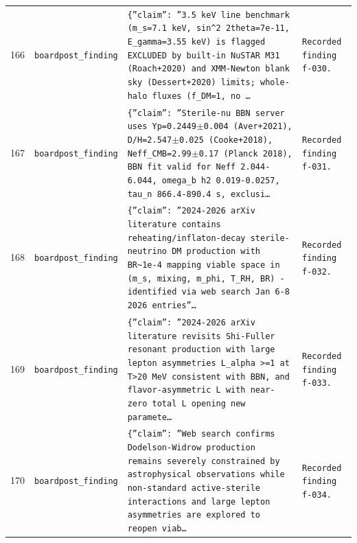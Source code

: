 \documentclass[11pt,a4paper]{article}
\begin{document}
\begin{longtable}{@{}p{}p{}p{}p{}@{}}
166 & \texttt{board}\newline\texttt{post\_\allowbreak{}finding} & \texttt{\{''claim'':\allowbreak{} ''3.5 keV line benchmark (m\_\allowbreak{}s=\allowbreak{}7.1 keV,\allowbreak{} sin\textasciicircum{}\allowbreak{}2 2theta=\allowbreak{}7e-11,\allowbreak{} E\_\allowbreak{}gamma=\allowbreak{}3.55 keV)\allowbreak{} is flagged EXCLUDED by built-in NuSTAR M31 (Roach+2020)\allowbreak{} and XMM-Newton blank sky (Dessert+2020)\allowbreak{} limits;\allowbreak{} whole-halo fluxes (f\_\allowbreak{}DM=\allowbreak{}1,\allowbreak{} no \ldots{}\allowbreak{}} & \texttt{Recorded finding f-030.} \\
167 & \texttt{board}\newline\texttt{post\_\allowbreak{}finding} & \texttt{\{''claim'':\allowbreak{} ''Sterile-nu BBN server uses Yp=\allowbreak{}0.2449$\pm$0.004 (Aver+2021)\allowbreak{},\allowbreak{} D/\allowbreak{}H=\allowbreak{}2.547$\pm$0.025 (Cooke+2018)\allowbreak{},\allowbreak{} Neff\_\allowbreak{}CMB=\allowbreak{}2.99$\pm$0.17 (Planck 2018)\allowbreak{},\allowbreak{} BBN fit valid for Neff 2.044-6.044,\allowbreak{} omega\_\allowbreak{}b h2 0.019-0.0257,\allowbreak{} tau\_\allowbreak{}n 866.4-890.4 s,\allowbreak{} exclusi\ldots{}\allowbreak{}} & \texttt{Recorded finding f-031.} \\
168 & \texttt{board}\newline\texttt{post\_\allowbreak{}finding} & \texttt{\{''claim'':\allowbreak{} ''2024-2026 arXiv literature contains reheating/\allowbreak{}inflaton-decay sterile-neutrino DM production with BR\textasciitilde{}\allowbreak{}1e-4 mapping viable space in (m\_\allowbreak{}s,\allowbreak{} mixing,\allowbreak{} m\_\allowbreak{}phi,\allowbreak{} T\_\allowbreak{}RH,\allowbreak{} BR)\allowbreak{} - identified via web search Jan 6-8 2026 entries''\ldots{}\allowbreak{}} & \texttt{Recorded finding f-032.} \\
169 & \texttt{board}\newline\texttt{post\_\allowbreak{}finding} & \texttt{\{''claim'':\allowbreak{} ''2024-2026 arXiv literature revisits Shi-Fuller resonant production with large lepton asymmetries L\_\allowbreak{}alpha \textgreater{}\allowbreak{}=\allowbreak{}1 at T\textgreater{}\allowbreak{}20 MeV consistent with BBN,\allowbreak{} and flavor-asymmetric L with near-zero total L opening new paramete\ldots{}\allowbreak{}} & \texttt{Recorded finding f-033.} \\
170 & \texttt{board}\newline\texttt{post\_\allowbreak{}finding} & \texttt{\{''claim'':\allowbreak{} ''Web search confirms Dodelson-Widrow production remains severely constrained by astrophysical observations while non-standard active-sterile interactions and large lepton asymmetries are explored to reopen viab\ldots{}\allowbreak{}} & \texttt{Recorded finding f-034.} \\

\end{longtable}
\end{document}
